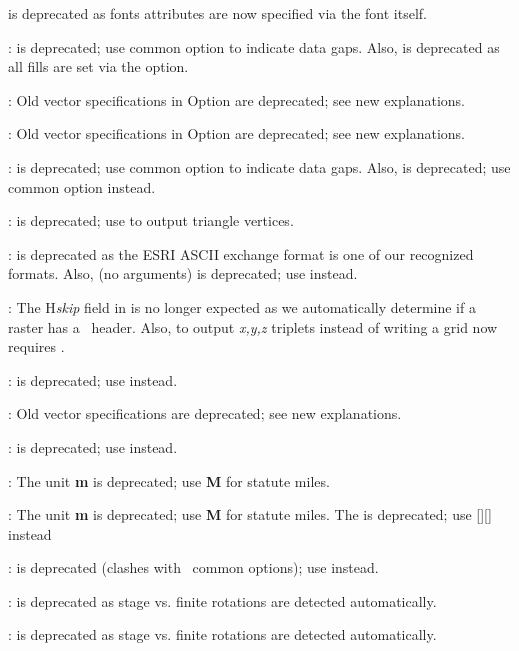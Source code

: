 \begin{enumerate}
{		 is deprecated as fonts attributes are now specified via the font itself.
	\item {}:  is deprecated; use common option  to indicate data gaps.  Also,
		 is deprecated as all fills are set via the  option.
	\item {}: Old vector specifications in Option  are deprecated; see new explanations.
	\item {}: Old vector specifications in Option  are deprecated; see new explanations.
	\item {}:  is deprecated; use common option  to indicate data gaps.  Also,
		 is deprecated; use common option  instead.
	\item {}:  is deprecated; use  to output triangle vertices.
	\item {}:  is deprecated as the ESRI ASCII exchange format is one of our recognized formats. Also,
		 (no arguments) is deprecated; use  instead.
	\item {}: The H{\it skip} field in  is no longer
		expected as we automatically determine if a raster has a \gmt\ header.  Also, to
		output {\it x,y,z} triplets instead of writing a grid now requires .
	\item {}:  is deprecated; use  instead.
	\item {}: Old vector specifications are deprecated; see new explanations.
	\item {}:  is deprecated; use  instead.
	\item {}: The unit {\bf m} is deprecated; use {\bf M} for statute miles.
	\item {}: The unit {\bf m} is deprecated; use {\bf M} for statute miles.
		The  is deprecated; use [][] instead
	\item {}:  is deprecated (clashes with \gmt\ common options); use  instead.
	\item {}:  is deprecated as stage vs. finite rotations are detected automatically.
	\item {}:  is deprecated as stage vs. finite rotations are detected automatically.
}
\end{enumerate}
